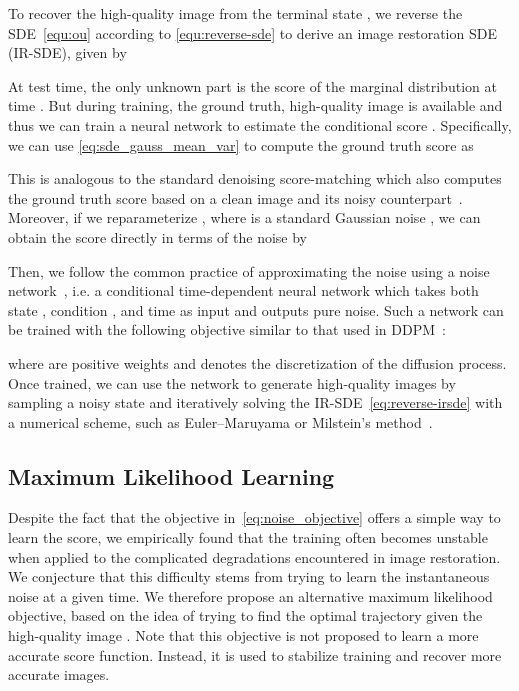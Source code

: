 \documentclass{article}
\theoremstyle{plain}
\theoremstyle{definition}
\theoremstyle{remark}
\begin{document}
To recover the high-quality image from the terminal state , we reverse the SDE~\eqref{equ:ou} according to \eqref{equ:reverse-sde} to derive an image restoration SDE (IR-SDE), given by

At test time, the only unknown part is the score  of the marginal distribution at time . But during training, the ground truth, high-quality image  is available and thus we can train a neural network to estimate the conditional score . Specifically, we can use \eqref{eq:sde_gauss_mean_var} to compute the ground truth score as

This is analogous to the standard denoising score-matching which also computes the ground truth score based on a clean image and its noisy counterpart~\cite{hyvarinen2005estimation}. Moreover, if we reparameterize , where  is a standard Gaussian noise , we can obtain the score directly in terms of the noise by

Then, we follow the common practice of approximating the noise using a noise network~\cite{ho2020denoising}, i.e. a conditional time-dependent neural network  which takes both state , condition , and time  as input and outputs pure noise. Such a network can be trained with the following objective similar to that used in DDPM~\cite{ho2020denoising}:

where  are positive weights and  denotes the discretization of the diffusion process. Once trained, we can use the network  to generate high-quality images by sampling a noisy state  and iteratively solving the IR-SDE~\eqref{eq:reverse-irsde} with a numerical scheme, such as Euler--Maruyama or Milstein's method~\cite{mil1975approximate}.


\subsection{Maximum Likelihood Learning}

Despite the fact that the objective in~\eqref{eq:noise_objective} offers a simple way to learn the score, we empirically found that the training  often becomes unstable when applied to the complicated degradations encountered in image restoration. We conjecture that this difficulty stems from trying to learn the instantaneous noise at a given time. We therefore propose an alternative maximum likelihood objective, based on the idea of trying to find the optimal trajectory  given the high-quality image . Note that this objective is not proposed to learn a more accurate score function. Instead, it is used to stabilize training and recover more accurate images. 
\end{document}
